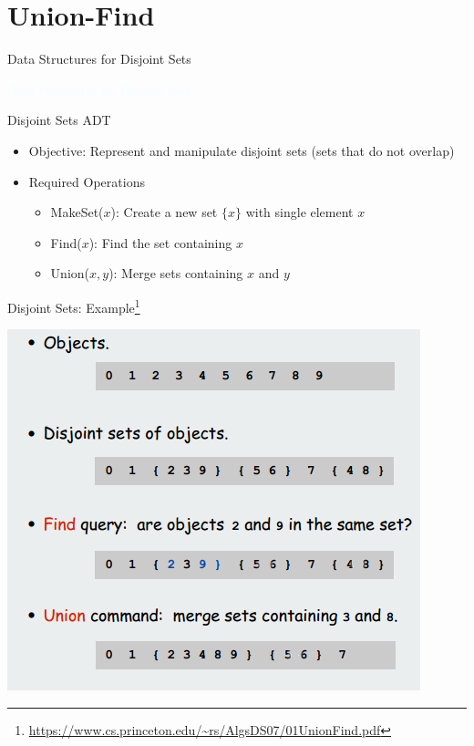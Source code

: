 \documentclass{beamer}
\newcommand{\thblue}[1]{{\Huge {\textcolor{azure}{#1}}}}
\begin{document}
\section{Union-Find}

\begin{frame}{Data Structures for Disjoint Sets}
    \begin{center}
        \thblue{Data Structures for Disjoint Sets}
    \end{center}
\end{frame}

\begin{frame}{Disjoint Sets ADT}
    \begin{itemize}
        \item Objective: Represent and manipulate disjoint sets (sets that do not overlap)
        \item Required Operations
        \begin{itemize}
            \item MakeSet($x$): Create a new set $\{x\}$ with single element $x$
            \item Find($x$): Find the set containing $x$
            \item Union($x,y$): Merge sets containing $x$ and $y$
        \end{itemize}
    \end{itemize}
\end{frame}

\begin{frame}{Disjoint Sets: Example\footnote{\url{https://www.cs.princeton.edu/~rs/AlgsDS07/01UnionFind.pdf}}}
    \begin{center}
        \includegraphics[scale=0.5]{disjointSetEg.png}
    \end{center}
\end{frame}
\end{document}
